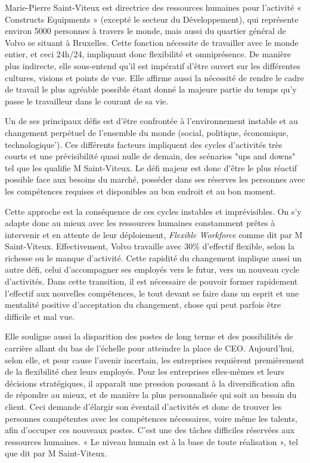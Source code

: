 \documentclass[a4paper, 12pt]{article}
\begin{document}
Marie-Pierre Saint-Viteux est directrice des ressources humaines pour l'activité « Constructs Equipments » (excepté le secteur du Développement), qui représente environ 5000 personnes à travers le monde, mais aussi du quartier général de Volvo se situant à Bruxelles. Cette fonction nécessite de travailler avec le monde entier, et ceci 24h/24, impliquant donc flexibilité et omniprésence. De manière plus indirecte, elle sous-entend qu'il est impératif d'être ouvert sur les différentes cultures, visions et points de vue. Elle affirme aussi la nécessité de rendre le cadre de travail le plus agréable possible étant donné la majeure partie du temps qu'y passe le travailleur dans le courant de sa vie.

Un de ses principaux défis est d'être confrontée à l'environnement instable et au changement perpétuel de l'ensemble du monde (social, politique, économique, technologique'). Ces différents facteurs impliquent des cycles d'activités très courts et une prévisibilité quasi nulle de demain,  des scénarios "ups and downs"  tel que les qualifie M Saint-Viteux. Le défi majeur est donc d'être le plus réactif possible face aux besoins du marché, posséder dans ses réserves les personnes avec les compétences requises et disponibles au bon endroit et au bon moment.    
						
	Cette approche est la conséquence de ces cycles instables et imprévisibles. On s'y adapte donc au mieux avec les ressources humaines constamment prêtes à intervenir et en attente de leur déploiement, \textit{Flexible Workforce} comme dit par M Saint-Viteux. Effectivement, Volvo travaille avec 30\% d'effectif flexible, selon la richesse ou le manque d'activité. Cette rapidité du changement implique aussi un autre défi, celui d'accompagner ses employés vers le futur, vers un nouveau cycle d'activités. Dans cette transition, il est nécessaire de pouvoir former rapidement l'effectif aux nouvelles compétences, le tout devant se faire dans un esprit et une mentalité positive d'acceptation du changement, chose qui peut parfois être difficile et mal vue.
 
Elle souligne aussi la disparition des postes de long terme et des possibilités de carrière allant du bas de l'échelle pour atteindre la place de CEO. Aujourd'hui, selon elle, et pour cause l'avenir incertain, les entreprises requièrent premièrement de la flexibilité chez leurs employés. Pour les entreprises elles-mêmes et leurs décisions stratégiques, il apparaît une pression poussant à la diversification afin de répondre au mieux, et de manière la plus personnalisée qui soit au besoin du client. Ceci demande d'élargir son éventail d'activités  et donc de trouver les personnes compétentes avec les compétences nécessaires, voire même les talents, afin d'occuper ces nouveaux postes. C'est une des tâches difficiles réservées aux ressources humaines. « Le niveau humain est à la base de toute réalisation », tel que dit par M Saint-Viteux.
\end{document}
